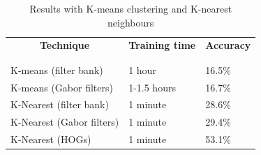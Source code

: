 \documentclass{article} %
\begin{document}
        \begin{table}[t]
            \begin{center}
                \begin{tabular}{lll}
                    \multicolumn{1}{c}{\bf Technique} &\multicolumn{1}{c}{\bf Training time} &\multicolumn{1}{c}{\bf Accuracy}\\
                    \\ \hline \\
                    K-means (filter bank) & 1 hour& 16.5\% \\
                    K-means (Gabor filters) &1-1.5 hours & 16.7\% \\
                    K-Nearest (filter bank) &1 minute& 28.6\% \\
                    K-Nearest (Gabor filters) &1 minute& 29.4\% \\
                    K-Nearest (HOGs) &1 minute& 53.1\% \\
                \end{tabular}
            \end{center}
            \caption{Results with K-means clustering and K-nearest neighbours}
            \label{tab:knn}
        \end{table}

    
\end{document}
